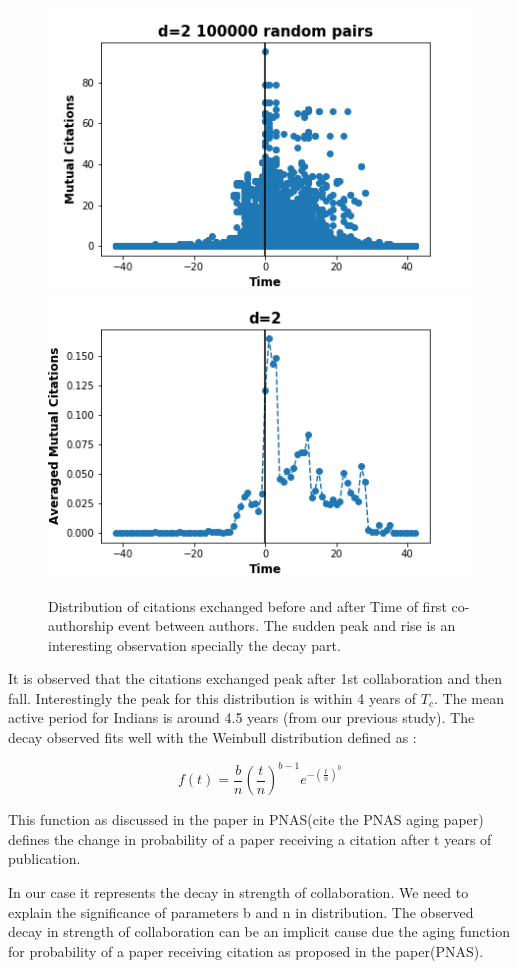 \documentclass[aps, pre, twocolumn, nofootinbib]{revtex4-1}
\begin{document}
\begin{figure}[htbp]  
	\centering
	
	\includegraphics[scale = 0.49]{plots/d2}
	\includegraphics[scale = 0.49]{plots/d2_avg}
	
	\captionsetup{singlelinecheck=false, justification=raggedright,  labelsep=space}
	\caption{Distribution of citations exchanged before and after Time of first co-authorship event between authors. The sudden peak and rise is an interesting observation specially the decay part.}
	\label{f5}
\end{figure}

It is observed that the citations exchanged peak after 1st collaboration and then fall. Interestingly the peak for this distribution is within 4 years of $T_c$. The mean active period for Indians is around 4.5 years (from our previous study). The decay observed fits well with the Weinbull distribution defined as :

\begin{equation}
 f(t) = \frac{b}{n}(\frac{t}{n})^{b-1} e^{-(\frac{t}{n})^b}
\end{equation}

{\color{blue}This function as discussed in the paper in PNAS(cite the PNAS aging paper) defines the change in probability of a paper receiving a citation after t years of publication.}

In our case it represents the decay in strength of collaboration. We need to explain the significance of parameters b and n in distribution. The observed decay in strength of collaboration can be an implicit cause due the aging function for probability of a paper receiving citation as proposed in the paper(PNAS). 
\end{document}
